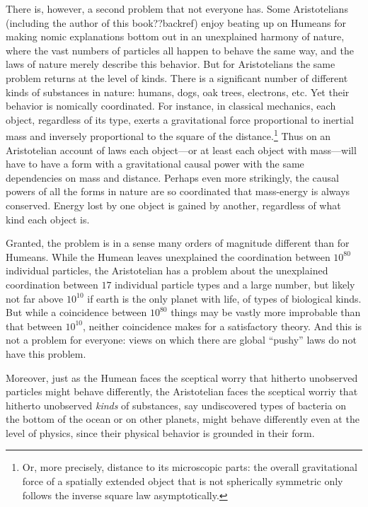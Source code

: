 There is, however, a second problem that not everyone has. Some Aristotelians (including the author of this book??backref) 
enjoy beating up on Humeans for making 
nomic explanations bottom out in an unexplained harmony of nature, where the vast numbers of particles all 
happen to behave the same way, and the laws of nature merely describe this behavior. But for Aristotelians the same problem returns 
at the level of kinds. There is a significant number of different kinds of 
substances in nature: humans, dogs, oak trees, electrons, etc. Yet their behavior is nomically coordinated. For instance,
in classical mechanics, each object, regardless of its type, exerts a gravitational force proportional to inertial mass
and inversely proportional to the square of the distance.\footnote{Or, more precisely, distance to its microscopic parts: the overall
gravitational force of a spatially extended object that is not spherically symmetric only follows the inverse square law 
asymptotically.}  Thus on an Aristotelian account of laws each object---or at 
least each object with mass---will have to have a form with a gravitational causal power with the same dependencies on 
mass and distance. Perhaps even more strikingly, the causal powers of all the forms in nature are so coordinated that 
mass-energy is always conserved. Energy lost by one object is gained by another, regardless of what kind each object 
is. 

Granted, the problem is in a sense many orders of magnitude different than for Humeans. While the Humean leaves 
unexplained the coordination between $10^{80}$ individual particles, the Aristotelian has a problem about the 
unexplained coordination between $17$ individual particle types and a large number, but likely not far above $10^{10}$
if earth is the only planet with life, of types of biological kinds. But while a coincidence between $10^{80}$ things
may be vastly more improbable than that between $10^{10}$, neither coincidence makes for a satisfactory theory.
And this is not a problem for everyone: views on which there are global ``pushy'' laws do not have this problem. 

Moreover, just as the Humean faces the sceptical worry that hitherto unobserved particles might behave differently, 
the Aristotelian faces the sceptical worriy that hitherto unobserved \textit{kinds} of substances, say undiscovered 
types of bacteria on the bottom of the ocean or on other planets, might behave differently even at the level of physics, 
since their physical behavior is grounded in their form. 

